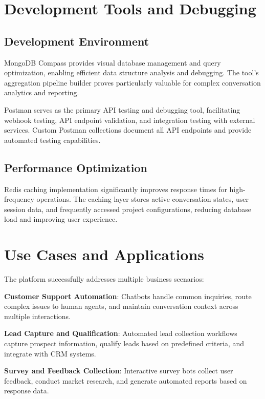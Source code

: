 \documentclass[conference]{IEEEtran}
\begin{document}
\section{Development Tools and Debugging}

\subsection{Development Environment}

MongoDB Compass provides visual database management and query optimization, enabling efficient data structure analysis and debugging. The tool's aggregation pipeline builder proves particularly valuable for complex conversation analytics and reporting.

Postman serves as the primary API testing and debugging tool, facilitating webhook testing, API endpoint validation, and integration testing with external services. Custom Postman collections document all API endpoints and provide automated testing capabilities.

\subsection{Performance Optimization}

Redis caching implementation significantly improves response times for high-frequency operations. The caching layer stores active conversation states, user session data, and frequently accessed project configurations, reducing database load and improving user experience.

\section{Use Cases and Applications}

The platform successfully addresses multiple business scenarios:

\textbf{Customer Support Automation}: Chatbots handle common inquiries, route complex issues to human agents, and maintain conversation context across multiple interactions.

\textbf{Lead Capture and Qualification}: Automated lead collection workflows capture prospect information, qualify leads based on predefined criteria, and integrate with CRM systems.

\textbf{Survey and Feedback Collection}: Interactive survey bots collect user feedback, conduct market research, and generate automated reports based on response data.
\end{document}
